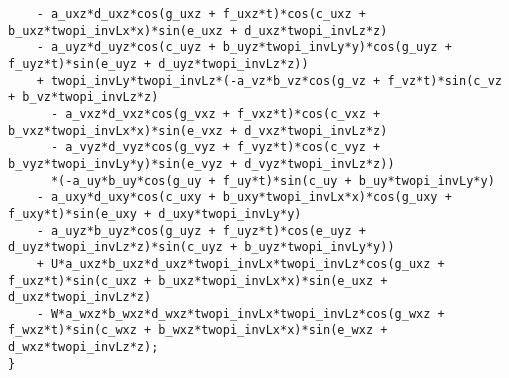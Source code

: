 \documentclass[10pt]{article}
\begin{document}
\begin{landscape}
\begin{footnotesize}
\begin{verbatim}
	- a_uxz*d_uxz*cos(g_uxz + f_uxz*t)*cos(c_uxz + b_uxz*twopi_invLx*x)*sin(e_uxz + d_uxz*twopi_invLz*z) 
	- a_uyz*d_uyz*cos(c_uyz + b_uyz*twopi_invLy*y)*cos(g_uyz + f_uyz*t)*sin(e_uyz + d_uyz*twopi_invLz*z)) 
    + twopi_invLy*twopi_invLz*(-a_vz*b_vz*cos(g_vz + f_vz*t)*sin(c_vz + b_vz*twopi_invLz*z) 
      - a_vxz*d_vxz*cos(g_vxz + f_vxz*t)*cos(c_vxz + b_vxz*twopi_invLx*x)*sin(e_vxz + d_vxz*twopi_invLz*z) 
      - a_vyz*d_vyz*cos(g_vyz + f_vyz*t)*cos(c_vyz + b_vyz*twopi_invLy*y)*sin(e_vyz + d_vyz*twopi_invLz*z))
      *(-a_uy*b_uy*cos(g_uy + f_uy*t)*sin(c_uy + b_uy*twopi_invLy*y) 
	- a_uxy*d_uxy*cos(c_uxy + b_uxy*twopi_invLx*x)*cos(g_uxy + f_uxy*t)*sin(e_uxy + d_uxy*twopi_invLy*y) 
	- a_uyz*b_uyz*cos(g_uyz + f_uyz*t)*cos(e_uyz + d_uyz*twopi_invLz*z)*sin(c_uyz + b_uyz*twopi_invLy*y)) 
    + U*a_uxz*b_uxz*d_uxz*twopi_invLx*twopi_invLz*cos(g_uxz + f_uxz*t)*sin(c_uxz + b_uxz*twopi_invLx*x)*sin(e_uxz + d_uxz*twopi_invLz*z) 
    - W*a_wxz*b_wxz*d_wxz*twopi_invLx*twopi_invLz*cos(g_wxz + f_wxz*t)*sin(c_wxz + b_wxz*twopi_invLx*x)*sin(e_wxz + d_wxz*twopi_invLz*z);
}

\end{verbatim}
\end{footnotesize}
 


\end{landscape}
\end{document}

